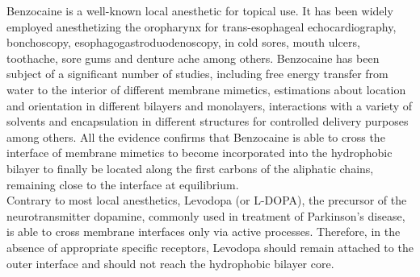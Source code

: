 \documentclass[3p,preprint,review]{elsarticle}
\begin{document}
	
	Benzocaine is a well-known local anesthetic for topical use. It has been widely
	employed anesthetizing the oropharynx for trans-esophageal echocardiography,
	bonchoscopy, esophagogastroduodenoscopy, in cold sores, mouth ulcers,
	toothache,
	sore gums and denture ache among others\cite{McEvoy2007}.
	Benzocaine has been subject of a significant number of studies, including free
	energy transfer from water to the interior of different membrane
	mimetics\cite{Martin2014a,Cascales2011,Porasso2009,J.J.LopezCascales2006},
	estimations about location and orientation in different bilayers and
	monolayers\cite{Matsuki2001,Suwalsky2004,Kuroda2000,Choi2001}, interactions
	with
	a variety of
	solvents\cite{Cardenas2016,Cardenas2018,Paluch2015,Avila2002,Aguado2013} and
	encapsulation in different structures for controlled delivery
	purposes\cite{Shkurenko2018,AttouiYahia2017,Li2016,Arantes2014,Puglia2011}
	among
	others. All the evidence confirms that Benzocaine is able to cross the
	interface
	of membrane mimetics to become incorporated into the
	hydrophobic bilayer to finally be located along the first carbons of the
  aliphatic chains, remaining close to the interface at equilibrium. \\
	Contrary to most local anesthetics, Levodopa (or L-DOPA), the precursor of the
	neurotransmitter dopamine, commonly used in treatment of Parkinson's
	disease\cite{Fabbrini1987},
	is
	able to cross membrane interfaces only via active
	processes\cite{BENTLEY2012349,PRYOR2013180}.
	Therefore, in the absence of appropriate specific receptors, Levodopa should
	remain attached to the outer interface and should not reach the hydrophobic
	bilayer core\cite{Orowski2012}.\\
	
\end{document}
